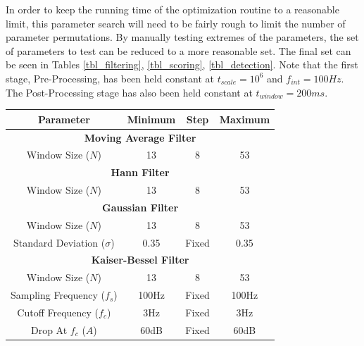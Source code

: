         In order to keep the running time of the optimization routine to a reasonable limit, this parameter search will need to be fairly rough to limit the number of parameter permutations. By manually testing extremes of the parameters, the set of parameters to test can be reduced to a more reasonable set. The final set can be seen in Tables \ref{tbl_filtering}, \ref{tbl_scoring}, \ref{tbl_detection}. Note that the first stage, Pre-Processing, has been held constant at $t_{scale}=10^6$ and $f_{int}=100Hz$. The Post-Processing stage has also been held constant at $t_{window}=200ms$. 


        \begin{center}
            \label{tbl_filtering}
            \begin{tabular}{|c|c|c|c|}
                \hline
                Parameter & Minimum & Step & Maximum \\
                \hline
                \multicolumn{4}{|c|}{\textbf{Moving Average Filter}} \\
                \hline
                Window Size ($N$) & 13 & 8 & 53 \\
                \hline
                \multicolumn{4}{|c|}{\textbf{Hann Filter}} \\
                \hline
                Window Size ($N$) & 13 & 8 & 53 \\
                \hline
                \multicolumn{4}{|c|}{\textbf{Gaussian Filter}} \\
                \hline
                Window Size ($N$) & 13 & 8 & 53 \\
                Standard Deviation ($\sigma$) & 0.35 & Fixed & 0.35 \\
                \hline
                \multicolumn{4}{|c|}{\textbf{Kaiser-Bessel Filter}} \\
                \hline
                Window Size ($N$) & 13 & 8 & 53 \\
                Sampling Frequency ($f_s$) & 100Hz & Fixed & 100Hz \\
                Cutoff Frequency ($f_c$) & 3Hz & Fixed & 3Hz \\
                Drop At $f_c$ ($A$) & 60dB & Fixed & 60dB \\
                \hline
            \end{tabular}
        \end{center}

